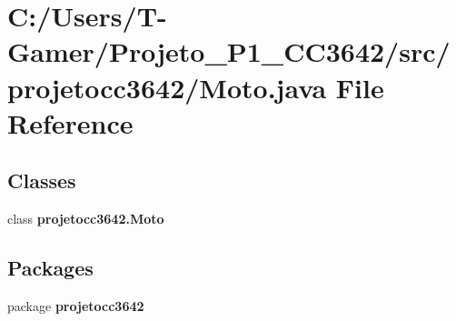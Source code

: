 \section{C\+:/\+Users/\+T-\/\+Gamer/\+Projeto\+\_\+\+P1\+\_\+\+C\+C3642/src/projetocc3642/\+Moto.java File Reference}
\label{_moto_8java}
\subsection*{Classes}
\begin{DoxyCompactItemize}
\item 
class \textbf{ projetocc3642.\+Moto}
\end{DoxyCompactItemize}
\subsection*{Packages}
\begin{DoxyCompactItemize}
\item 
package \textbf{ projetocc3642}
\end{DoxyCompactItemize}
